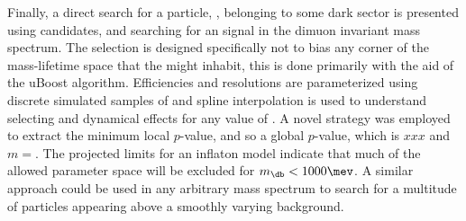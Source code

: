 


%
%
%
%


Finally, a direct search for a \np particle, \db, belonging to some dark sector is presented using
\btokstrmumu candidates, and searching for an signal in the dimuon invariant mass spectrum.
The selection is designed specifically not to bias any corner of the mass-lifetime space that the
\db might inhabit, this is done primarily with the aid of the uBoost algorithm.
Efficiencies and resolutions are parameterized using discrete simulated samples of \btokstrdb
and spline interpolation is used to understand selecting and dynamical effects for any value of
\mass{\db}.
A novel strategy was employed to extract the minimum local $p$-value, and so a global $p$-value,
which is $xxx$ and $m=$.
The projected limits for an inflaton model indicate that much of the allowed parameter space will
be excluded for $m_\db<1000\mev$.
A similar approach could be used in any arbitrary mass spectrum to search for a multitude of
particles appearing above a smoothly varying background.



